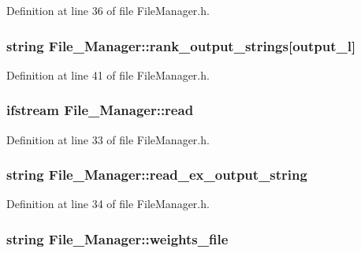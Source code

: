 Definition at line 36 of file File\-Manager.\-h.

\hypertarget{a00001_a578abb99a35121fea6c83f1dc21cc2af}{
\subsubsection[{rank\-\_\-output\-\_\-strings}]{\setlength{\rightskip}{0pt plus 5cm}string File\-\_\-\-Manager\-::rank\-\_\-output\-\_\-strings\mbox{[}{\bf output\-\_\-l}\mbox{]}\hspace{0.3cm}{\ttfamily [private]}}}\label{d8/d84/a00001_a578abb99a35121fea6c83f1dc21cc2af}


Definition at line 41 of file File\-Manager.\-h.

\hypertarget{a00001_a035fb2bdf99f8f928d049bc950c81f4c}{
\subsubsection[{read}]{\setlength{\rightskip}{0pt plus 5cm}ifstream File\-\_\-\-Manager\-::read\hspace{0.3cm}{\ttfamily [private]}}}\label{d8/d84/a00001_a035fb2bdf99f8f928d049bc950c81f4c}


Definition at line 33 of file File\-Manager.\-h.

\hypertarget{a00001_af7d8ea2c0a997e16600478c0020b1858}{
\subsubsection[{read\-\_\-ex\-\_\-output\-\_\-string}]{\setlength{\rightskip}{0pt plus 5cm}string File\-\_\-\-Manager\-::read\-\_\-ex\-\_\-output\-\_\-string\hspace{0.3cm}{\ttfamily [private]}}}\label{d8/d84/a00001_af7d8ea2c0a997e16600478c0020b1858}


Definition at line 34 of file File\-Manager.\-h.

\hypertarget{a00001_aab02256124e6eb39e10e3c9765f0bcb3}{
\subsubsection[{weights\-\_\-file}]{\setlength{\rightskip}{0pt plus 5cm}string File\-\_\-\-Manager\-::weights\-\_\-file\hspace{0.3cm}{\ttfamily [private]}}}\label{d8/d84/a00001_aab02256124e6eb39e10e3c9765f0bcb3}


